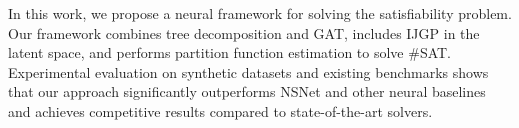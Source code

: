 In this work, we propose a neural framework for solving the satisfiability problem. Our framework combines tree decomposition and GAT, includes IJGP in the latent space, and performs partition function estimation to solve \#SAT. Experimental evaluation on synthetic datasets and existing benchmarks shows that our approach significantly outperforms NSNet and other neural baselines and achieves competitive results compared to state-of-the-art solvers.